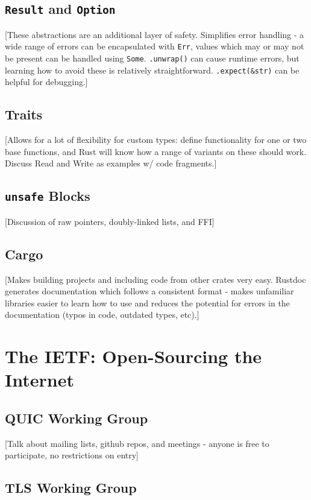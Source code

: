 \documentclass{l4proj}
\begin{document}
\section{\texttt{Result} and \texttt{Option}}
[These abstractions are an additional layer of safety. Simplifies error handling - a wide range of errors can be encapsulated with \texttt{Err}, values which may or may not be present can be handled using \texttt{Some}. \texttt{.unwrap()} can cause runtime errors, but learning how to avoid these is relatively straightforward. \texttt{.expect(\&str)} can be helpful for debugging.]

\section{Traits}
[Allows for a lot of flexibility for custom types: define functionality for one or two base functions, and Rust will know how a range of variants on these should work. Discuss Read and Write as examples w/ code fragments.]

\section{\texttt{unsafe} Blocks}
[Discussion of raw pointers, doubly-linked lists, and FFI]

\section{Cargo}
[Makes building projects and including code from other crates very easy. Rustdoc generates documentation which follows a consistent format - makes unfamiliar libraries easier to learn how to use and reduces the potential for errors in the documentation (typos in code, outdated types, etc).]


\pagebreak


\chapter{The IETF: Open-Sourcing the Internet}

\section{QUIC Working Group}
[Talk about mailing lists, github repos, and meetings - anyone is free to participate, no restrictions on entry]

\section{TLS Working Group}
\end{document}
